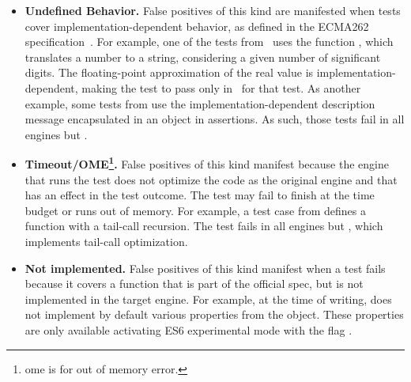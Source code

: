 \documentclass[10pt,conference,anonymous]{IEEEtran}
\begin{document}
\begin{itemize}
  \item \textbf{Undefined Behavior.} False positives of this kind are
    manifested when tests cover implementation-dependent behavior, as
    defined in the ECMA262 specification~\cite{ecmas262-spec}. For
    example, one of the tests from \jerry\ uses the function
    , which translates a
    number to a string, considering a given number of significant
    digits. The floating-point approximation of the real value is
    implementation-dependent, making the test to pass only in
    \chakra\ for that test. As another example, some tests from
     use the implementation-dependent description message encapsulated in an  object
    in assertions. As such, those tests fail in all engines but .

  \item \textbf{Timeout/OME\footnote{ome is for out of memory
      error.}.} False positives of this kind manifest because the
    engine that runs the test does not optimize the code as the
    original engine and that has an effect in the test outcome.  The
    test may fail to finish at the time budget or runs out of
    memory. For example, a test case from \jsc{} defines a function
    with a tail-call recursion. The test fails in all engines but
    \jsc{}, which implements tail-call optimization.


  \item \textbf{Not implemented.} False positives of this kind
    manifest when a test fails because it covers a function that is
    part of the official spec, but is not implemented in the target
    engine. For example, at the time of writing, \chakra{} does not
    implement by default various properties from the 
    object. These properties are only available activating ES6
    experimental mode with the flag .


\end{itemize}
\end{document}
